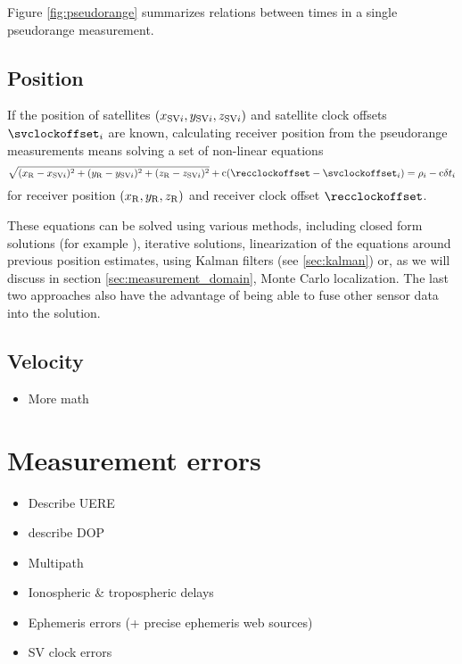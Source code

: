 Figure \ref{fig:pseudorange} summarizes relations between times in a single pseudorange measurement.

\subsection{Position}

If the position of satellites \(\left(x_{\mathrm{SV}i},y_{\mathrm{SV}i},z_{\mathrm{SV}i}\right)\) and satellite
clock offsets \(\svclockoffset_i\) are known,
calculating receiver position from the pseudorange measurements means solving a set of non-linear equations
\begin{equation}
	\sqrt{(x_\mathrm{R} - x_{\mathrm{SV}i})^2 + (y_\mathrm{R} - y_{\mathrm{SV}i})^2 +(z_\mathrm{R} - z_{\mathrm{SV}i})^2} +
	\speedoflight (\recclockoffset - \svclockoffset_i)
	=
	\rho_i - \speedoflight\geomrangedelays_i
\end{equation}
for receiver position \(\left(x_\mathrm{R},y_\mathrm{R},z_\mathrm{R}\right)\) and receiver clock offset \(\recclockoffset\).

These equations can be solved using various methods, including closed form solutions
(for example \cite{leva96}), iterative solutions, linearization of the equations around
previous position estimates, using Kalman filters (see \ref{sec:kalman}) or,
as we will discuss in section \ref{sec:measurement_domain}, Monte Carlo localization.
The last two approaches also have the advantage of being able to fuse other sensor data
into the solution.


\subsection{Velocity}
\begin{itemize}
\item More math
\end{itemize}

\section{Measurement errors}
\label{sec:gps-errors}
\begin{itemize}
\item Describe UERE
\item describe DOP
\label{sec:gps-dop}
\end{itemize}

\begin{itemize}
\item Multipath
\item Ionospheric \& tropospheric delays
\item Ephemeris errors (+ precise ephemeris web sources)
\item SV clock errors
\end{itemize}

